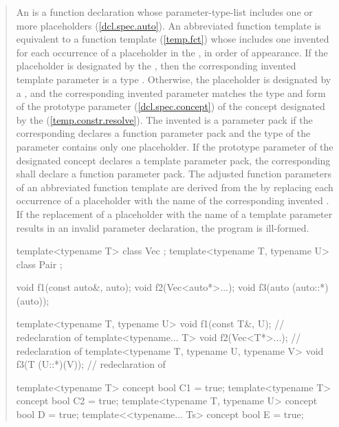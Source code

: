 \begin{quote}
\pnum
An  is a function declaration whose
parameter-type-list includes one or more placeholders (\ref{dcl.spec.auto}).
% 
An abbreviated function template is equivalent to a function template
(\ref{temp.fct}) whose 
includes one invented  for each occurrence 
of a placeholder in the ,
in order of appearance. 
% 
If the placeholder is designated by the 
, then the corresponding invented template 
parameter is a type .
% 
Otherwise, the placeholder is designated by a 
, and the corresponding invented 
parameter matches the type and form of the prototype parameter 
(\ref{dcl.spec.concept}) of the concept designated by the 
 (\ref{temp.constr.resolve}).
% 
The invented  is a parameter pack if 
the corresponding  declares a function 
parameter pack and the type of the parameter contains only one placeholder.
% 
If the prototype parameter of the designated concept declares a template 
parameter pack, the corresponding  shall
declare a function parameter pack.
% 
The adjusted function parameters of an abbreviated function template are derived
from the  by replacing each 
occurrence of a placeholder with the name of the corresponding invented 
.
% 
If the replacement of a placeholder with the name of a template parameter
results in an invalid parameter declaration, the program is ill-formed.

\enterexample
\begin{codeblock}
template<typename T> class Vec { };
template<typename T, typename U> class Pair { };

void f1(const auto&, auto);
void f2(Vec<auto*>...);
void f3(auto (auto::*)(auto));

template<typename T, typename U> 
  void f1(const T&, U);        // redeclaration of 
template<typename... T> 
  void f2(Vec<T*>...);         // redeclaration of 
template<typename T, typename U, typename V>
  void f3(T (U::*)(V));        // redeclaration of 

template<typename T> concept bool C1 = true;
template<typename T> concept bool C2 = true;
template<typename T, typename U> concept bool D = true;
template<<typename... Ts> concept bool E = true;


\end{codeblock}
\end{quote}

